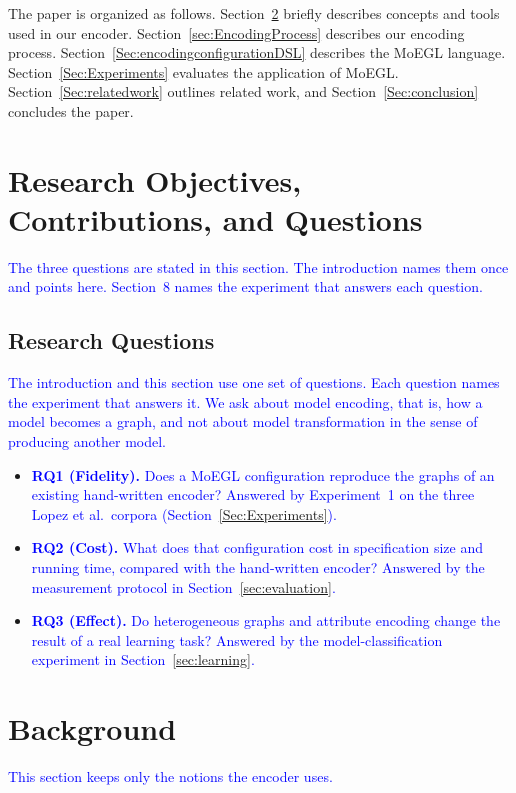 \documentclass[journal,article,submit,moreauthors,technologies]{Definitions/mdpi}
\newcommand{\rev}[1]{\textcolor{blue}{#1}}
\begin{document}
The paper is organized as follows. Section~\ref{Sec:background} briefly describes concepts and tools used in our encoder. Section~\ref{sec:EncodingProcess} describes our encoding process. Section~\ref{Sec:encodingconfigurationDSL} describes the MoEGL language. Section~\ref{Sec:Experiments} evaluates the application of MoEGL. Section~\ref{Sec:relatedwork} outlines related work, and Section~\ref{Sec:conclusion} concludes the paper.

\section{Research Objectives, Contributions, and Questions}
\rev{The three questions are stated in this section. The introduction names them once and points here. Section~8 names the experiment that answers each question.}

\subsection{Research Questions}\label{sec:rqs}
\rev{The introduction and this section use one set of questions. Each question names the experiment that answers it. We ask about model encoding, that is, how a model becomes a graph, and not about model transformation in the sense of producing another model.}
\begin{itemize}
    \item \rev{\textbf{RQ1 (Fidelity).} Does a MoEGL configuration reproduce the graphs of an existing hand-written encoder? Answered by Experiment~1 on the three Lopez et al.\ corpora (Section~\ref{Sec:Experiments}).}
    \item \rev{\textbf{RQ2 (Cost).} What does that configuration cost in specification size and running time, compared with the hand-written encoder? Answered by the measurement protocol in Section~\ref{sec:evaluation}.}
    \item \rev{\textbf{RQ3 (Effect).} Do heterogeneous graphs and attribute encoding change the result of a real learning task? Answered by the model-classification experiment in Section~\ref{sec:learning}.}
\end{itemize}



\section{Background} \label{Sec:background}
\rev{This section keeps only the notions the encoder uses.}
\end{document}
